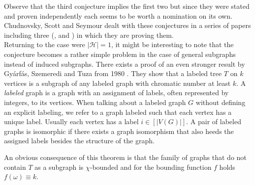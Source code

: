 Observe that the third conjecture implies the first two but since they were stated and proven independently each seems to be worth a nomination on its own. Chudnovsky, Scott and Seymour dealt with these conjectures in a series of papers including three (\cite{SS14}, \cite{CSS15} and \cite{CSSS17}) in which they are proving them.
\\

Returning to the case were $\vert\mathcal{H}\vert =1$, it might be interesting to note that the conjecture becomes a rather simple problem in the case of general subgraphs instead of induced subgraphs. There exists a proof of an even stronger result by Gyárfás, Szemeredi and Tuza from 1980 \cite{GST80}. They show that a labeled tree $T$ on $k$ vertices is a subgraph of any labeled graph with chromatic number at least $k$. A \textit{labeled} graph is a graph with an assignment of labels, often represented by integers, to its vertices. When talking about a labeled graph $G$ without defining an explicit labeling, we refer to a graph labeled such that each vertex has a unique label. Usually each vertex has a label $i\in [\vert V(G)\vert ]$. A pair of labeled graphs is isomorphic if there exists a graph isomorphism that also heeds the assigned labels besides the structure of the graph.

An obvious consequence of this theorem is that the family of graphs that do not contain $T$ as a subgraph is $\chi$-bounded and for the bounding function $f$ holds $f(\omega )\equiv k$.

